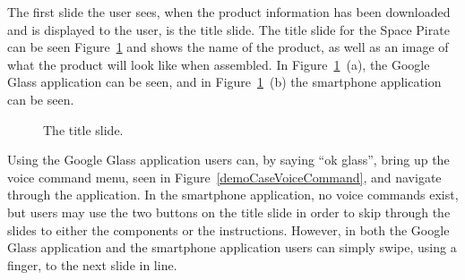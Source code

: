 The first slide the user sees, when the product information has been downloaded and is displayed to the user, is the title slide. The title slide for the Space Pirate can be seen Figure~\ref{demoCase1} and shows the name of the product, as well as an image of what the product will look like when assembled. In Figure~\ref{demoCase1}~(a), the Google Glass application can be seen, and in Figure~\ref{demoCase1}~(b) the smartphone application can be seen. 

	\begin{figure}[H]%
		\centering
		\qquad
		\caption{The title slide.}
		\label{demoCase1}
	\end{figure}	

Using the Google Glass application users can, by saying ``ok glass'', bring up the voice command menu, seen in Figure~\ref{demoCaseVoiceCommand}, and navigate through the application. In the smartphone application, no voice commands exist, but users may use the two buttons on the title slide in order to skip through the slides to either the components or the instructions. However, in both the Google Glass application and the smartphone application users can simply swipe, using a finger, to the next slide in line. 

